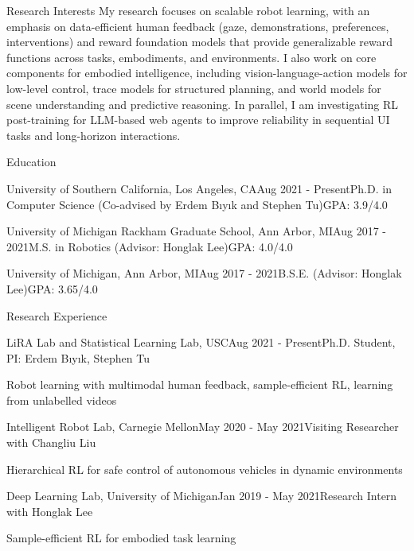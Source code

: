 \documentclass{resume}
\begin{document}
\begin{rSection}{Research Interests}
My research focuses on scalable robot learning, with an emphasis on data-efficient human feedback (gaze, demonstrations, preferences, interventions) and reward foundation models that provide generalizable reward functions across tasks, embodiments, and environments. I also work on core components for embodied intelligence, including vision-language-action models for low-level control, trace models for structured planning, and world models for scene understanding and predictive reasoning. In parallel, I am investigating RL post-training for LLM-based web agents to improve reliability in sequential UI tasks and long-horizon interactions. 
\end{rSection}

\begin{rSection}{Education}
\begin{rSubsection}{University of Southern California, {\normalfont Los Angeles, CA}}{Aug 2021 - Present}{Ph.D. {\normalfont in Computer Science (Co-advised by Erdem Bıyık and Stephen Tu)}}{GPA: 3.9/4.0}
\end{rSubsection}
\begin{rSubsection}{University of Michigan Rackham Graduate School, {\normalfont Ann Arbor, MI}}{Aug 2017 - 2021}{M.S. {\normalfont in Robotics (Advisor: Honglak Lee)}}{GPA: 4.0/4.0}
\end{rSubsection}
\begin{rSubsection}{University of Michigan, {\normalfont Ann Arbor, MI}}{Aug 2017 - 2021}{B.S.E. {\normalfont (Advisor: Honglak Lee)}}{GPA: 3.65/4.0}
\end{rSubsection}
\end{rSection}

\begin{rSection}{Research Experience}
\begin{rSubsection}{LiRA Lab and Statistical Learning Lab, {\normalfont USC}}{Aug 2021 - Present}{Ph.D. Student, PI: Erdem Bıyık, Stephen Tu}{}
\item Robot learning with multimodal human feedback, sample-efficient RL, learning from unlabelled videos
\end{rSubsection}
\begin{rSubsection}{Intelligent Robot Lab, {\normalfont Carnegie Mellon}}{May 2020 - May 2021}{Visiting Researcher {\normalfont with Changliu Liu}}{}
\item Hierarchical RL for safe control of autonomous vehicles in dynamic environments
\end{rSubsection}
\begin{rSubsection}{Deep Learning Lab, {\normalfont University of Michigan}}{Jan 2019 - May 2021}{Research Intern {\normalfont with Honglak Lee}}{}
\item Sample-efficient RL for embodied task learning
\end{rSubsection}
\end{rSection}
\end{document}
